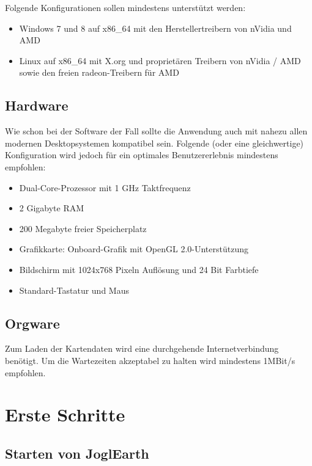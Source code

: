 \documentclass[10pt]{scrreprt}
\begin{document}
Folgende Konfigurationen sollen mindestens unterstützt werden:
\begin{itemize}
\item Windows 7 und 8 auf x86{\_}64 mit den Herstellertreibern von nVidia und AMD
\item Linux auf x86{\_}64 mit X.org und proprietären Treibern von nVidia / AMD sowie den freien radeon-Treibern für AMD
\end{itemize}

\vspace{3mm}
\section{Hardware}
Wie schon bei der Software der Fall sollte die Anwendung auch mit nahezu allen modernen Desktopsystemen kompatibel sein. Folgende (oder eine gleichwertige) Konfiguration wird jedoch für ein optimales Benutzererlebnis mindestens empfohlen:
\begin{itemize}
\item Dual-Core-Prozessor mit 1 GHz Taktfrequenz
\item 2 Gigabyte RAM
\item 200 Megabyte freier Speicherplatz
\item Grafikkarte: Onboard-Grafik mit OpenGL 2.0-Unterstützung
\item Bildschirm mit 1024x768 Pixeln Auflösung und 24 Bit Farbtiefe
\item Standard-Tastatur und Maus
\end{itemize}

\vspace{3mm}
\section{Orgware}
Zum Laden der Kartendaten wird eine durchgehende Internetverbindung benötigt. Um die Wartezeiten akzeptabel zu halten wird mindestens 1MBit/s empfohlen.





\chapter{Erste Schritte}


\section{Starten von JoglEarth}
\end{document}
